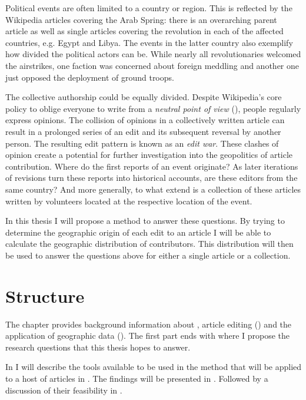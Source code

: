 Political events are often limited to a country or region. 
This is reflected by the Wikipedia articles covering the Arab Spring: there is an overarching parent article as well as single articles covering the revolution in each of the affected countries, e.g. Egypt and Libya.
The events in the latter country also exemplify how divided the political actors can be.
While nearly all revolutionaries welcomed the airstrikes, one faction was concerned about foreign meddling and another one just opposed the deployment of ground troops.\cite{econ18290470}

The collective authorship could be equally divided.
Despite Wikipedia's core policy to oblige everyone to write from a \emph{neutral point of view} (), people regularly express opinions. 
The collision of opinions in a collectively written article can result in a prolonged series of an edit and its subsequent reversal by another person. 
The resulting edit pattern is known as an \emph{edit war}.\cite{suh2007us}
These clashes of opinion create a potential for further investigation into the geopolitics of article contribution.
Where do the first reports of an event originate?
As later iterations of revisions turn these reports into historical accounts, are these editors from the same country?
And more generally, to what extend is a collection of these articles written by volunteers located at the respective location of the event.

In this thesis I will propose a method to answer these questions.
By trying to determine the geographic origin of each edit to an article I will be able to calculate the geographic distribution of contributors.
This distribution will then be used to answer the questions above for either a single article or a collection.


\section{Structure}


The chapter  provides background information about , article editing () and the application of geographic data ().
The first part ends with  where I propose the research questions that this thesis hopes to answer.

In  I will describe the tools available to be used in the method that will be applied to a host of articles in .
The findings will be presented in .
Followed by a discussion of their feasibility in .